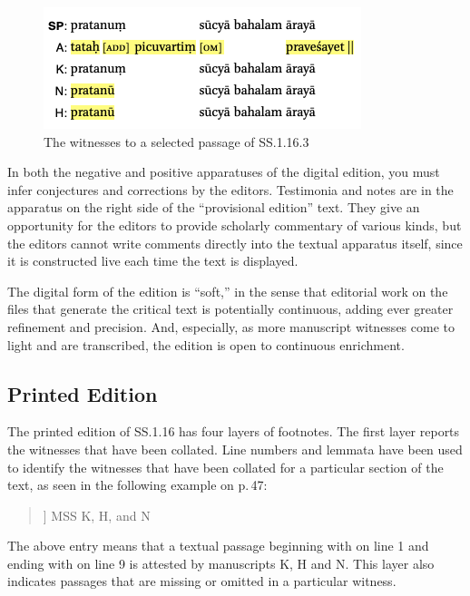 \begin{figure}[h]
    \centering
    \includegraphics[draft=false,width=.7\textwidth]{media/SS.1.16b.positive}
    \caption{The witnesses to a selected passage of SS.1.16.3}
    \label{SS.1.16.3}
\end{figure}

In both the negative and positive apparatuses of the digital edition, you must
infer conjectures and corrections by the editors. Testimonia and notes are in the
apparatus on the right side of the “provisional edition” text.  They give an
opportunity for the editors to provide scholarly commentary of various kinds, but
the editors cannot write comments directly into the textual apparatus itself,
since it is constructed live each time the text is displayed.

The digital form of the edition is “soft,” in the sense that editorial work on
the files that generate the critical text is potentially continuous, adding
ever greater refinement and precision.  And, especially, as more manuscript
witnesses come to light and are transcribed, the edition is open to continuous
enrichment.

\subsection{Printed Edition}

The printed edition of SS.1.16 has four layers of footnotes. The
first layer reports the witnesses that have been collated. Line numbers and
lemmata have been used to identify the witnesses that have been collated for a
particular section of the text, as seen in the following example on p.\,47:
\begin{quote}
     ] MSS K, H, and N
\end{quote}
The above entry means that a textual passage beginning with  on
line 1 and ending with  on line 9 is attested by
manuscripts K, H and N. This layer also indicates passages that are missing or
omitted in a particular witness.

